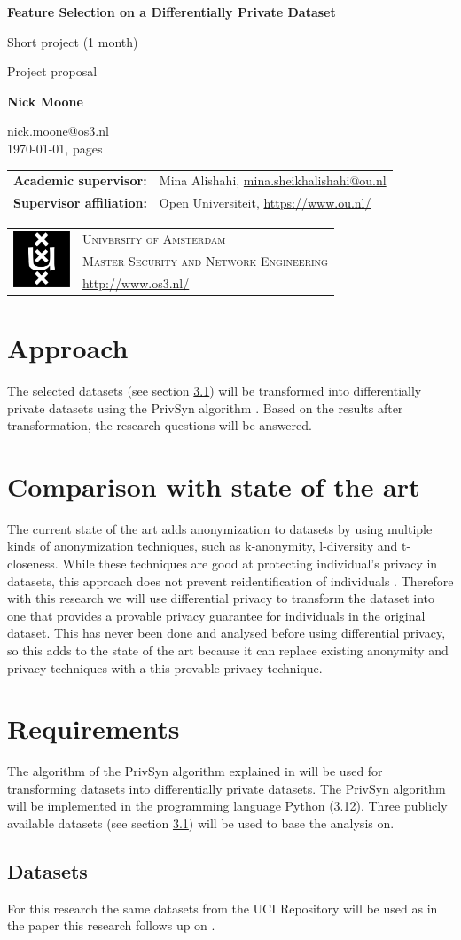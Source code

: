 \documentclass[a4paper,10pt,titlepage]{report}
\makeatletter
\newcommand{\email}[1]{\ttfamily\href{mailto:#1}{#1}}
\newcommand{\uvacoverfoot}{%
	\vfill
	\begin{center}
		\begin{tabular}{r|l}
			\multirow{3}{*}{\includegraphics[height=48pt]{uva.pdf}}
			&\textsc{\Large University of Amsterdam}\\
			&\textsc{Master Security and Network Engineering}\\
			&\url{http://www.os3.nl/}
		\end{tabular}
	\end{center}
}
\renewcommand{\maketitle}{%
	\thispagestyle{empty}
	\enlargethispage{30pt}
	\renewcommand{\thefootnote}{\fnsymbol{footnote}}
	\setcounter{page}{0}
	\vspace{60pt}
	\begin{center}
		{\Huge\bfseries Feature Selection on a Differentially Private Dataset \par}
		\vspace{11pt}
        { Short project (1 month) \par}

        
		\vspace{11pt}
        {\Large Project proposal \par}
		
		\vspace{44pt}
		{\Large\bfseries Nick Moone \par}
		\email{nick.moone@os3.nl}\\
		\vspace{11pt}
		\today, \pageref{LastPage} pages
	\end{center}
	\vfill
    \begin{center}
    	\begin{tabular}{ll}
    		\textbf{Academic supervisor:} 	& Mina Alishahi, \email{mina.sheikhalishahi@ou.nl} \\
    		\textbf{Supervisor affiliation:} & Open Universiteit, \url{https://www.ou.nl/}
    	\end{tabular}
    \end{center}
	\uvacoverfoot
	\newpage
	\setcounter{footnote}{0}
	\renewcommand{\thefootnote}{\arabic{footnote}}
	\setlength{\parskip}{0pt}
}
\makeatother
\begin{document}
\maketitle


% 

\chapter{Approach}
The selected datasets (see section \ref{sec:datasets}) will be transformed into differentially private \cite{dpuitleg} datasets using the PrivSyn algorithm \cite{privsyn}. Based on the results after transformation, the research questions will be answered.

\chapter{Comparison with state of the art}
The current state of the art \cite{originalpaper} adds anonymization to datasets by using multiple kinds of anonymization techniques, such as k-anonymity, l-diversity and t-closeness. While these techniques are good at protecting individual's privacy in datasets, this approach does not prevent reidentification of individuals \cite{dpuitleg}. Therefore with this research we will use differential privacy to transform the dataset into one that provides a provable privacy guarantee for individuals in the original dataset. This has never been done and analysed before using differential privacy, so this adds to the state of the art because it can replace existing anonymity and privacy techniques with a this provable privacy technique.

\chapter{Requirements}
The algorithm of the PrivSyn algorithm explained in \cite{privsyn} will be used for transforming datasets into differentially private datasets.
The PrivSyn algorithm will be implemented in the programming language Python (3.12).
Three publicly available datasets (see section \ref{sec:datasets}) will be used to base the analysis on.

\section{Datasets}
\label{sec:datasets}
For this research the same datasets from the UCI Repository \cite{datasetsrepo} will be used as in the paper this research follows up on \cite{originalpaper}. 
\end{document}
